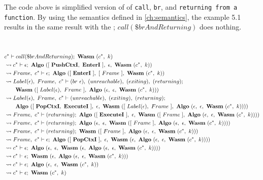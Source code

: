 The code above is simplified version of \spectecp{} of \texttt{call},
\texttt{br}, and \texttt{returning from a function}.
By using the semantics defined in \cref{ch:semantics}, the example 5.1 results
in the same result with the \officialp{}; $call(\$brAndReturning)$ does
nothing.


 \\
\begin{align}
  &c^* \vdash call(\$brAndReturning); ~ \textbf{Wasm} ~ (c^*, ~ k)
  \label{eq:resolve-1} \\
  &\leadsto c^* \vdash \epsilon; ~ \textbf{Algo} ~ ([ ~ \textbf{PushCtxI}, ~ \textbf{EnterI} ~ ], ~ \epsilon, ~ \textbf{Wasm} ~ (c^*, ~ k))
  \label{eq:resolve-2} \\
  &\leadsto Frame, ~ c^* \vdash \epsilon; ~ \textbf{Algo} ~ ([ ~ \textbf{EnterI} ~ ], ~ [ ~ Frame ~ ], ~ \textbf{Wasm} ~ (c^*, ~ k))
  \label{eq:resolve-3} \\
  &\leadsto Label(\epsilon), ~ Frame, ~ c^* \vdash (br ~ \epsilon), ~ (unreachable), ~ (exiting), ~ (returning); \\
  &\quad\quad \textbf{Wasm} ~ ([ ~ Label(\epsilon), ~ Frame ~ ], ~ \textbf{Algo} ~ (\epsilon, ~ \epsilon, ~ \textbf{Wasm} ~ (c^*, ~ k)))
  \label{eq:resolve-4} \\
  &\leadsto Label(\epsilon), ~ Frame, ~ c^* \vdash (unreachable), ~ (exiting), ~ (returning); \\
  &\quad\quad \textbf{Algo} ~ ([ ~ \textbf{PopCtxI}, ~ \textbf{ExecuteI} ~ ], ~ \epsilon, ~ \textbf{Wasm} ~ ([ ~ Label(\epsilon), ~ Frame ~ ], ~ \textbf{Algo} ~ (\epsilon, ~ \epsilon, ~ \textbf{Wasm} ~ (c^*, ~ k))))
  \label{eq:resolve-5} \\
  &\leadsto Frame, ~ c^* \vdash (returning); ~
    \textbf{Algo} ~ ([ ~ \textbf{ExecuteI} ~ ], ~ \epsilon, ~ \textbf{Wasm} ~ ([ ~ Frame ~ ], ~ \textbf{Algo} ~ (\epsilon, ~ \epsilon, ~ \textbf{Wasm} ~ (c^*, ~ k))))
  \label{eq:resolve-6} \\
  &\leadsto Frame, ~ c^* \vdash (returning); ~
    \textbf{Algo} ~ (\epsilon, ~ \epsilon, ~ \textbf{Wasm} ~ ([ ~ Frame ~ ], ~ \textbf{Algo} ~ (\epsilon, ~ \epsilon, ~ \textbf{Wasm} ~ (c^*, ~ k))))
  \label{eq:resolve-7} \\
  &\leadsto Frame, ~ c^* \vdash (returning); ~ \textbf{Wasm} ~ ([ ~ Frame ~ ], ~ \textbf{Algo} ~ (\epsilon, ~ \epsilon, ~ \textbf{Wasm} ~ (c^*, ~ k)))
  \label{eq:resolve-8} \\
  &\leadsto Frame, ~ c^* \vdash \epsilon; ~
    \textbf{Algo} ~ ([ ~ \textbf{PopCtxI} ~ ], ~ \epsilon, ~ \textbf{Wasm} ~ (\epsilon, ~ \textbf{Algo} ~ (\epsilon, ~ \epsilon, ~ \textbf{Wasm} ~ (c^*, ~ k))))
  \label{eq:resolve-9} \\
  &\leadsto c^* \vdash \epsilon; ~
    \textbf{Algo} ~ (\epsilon, ~ \epsilon, ~ \textbf{Wasm} ~ (\epsilon, ~ \textbf{Algo} ~ (\epsilon, ~ \epsilon, ~ \textbf{Wasm} ~ (c^*, ~ k))))
  \label{eq:resolve-10} \\
  &\leadsto c^* \vdash \epsilon; ~ \textbf{Wasm} ~ (\epsilon, ~ \textbf{Algo} ~ (\epsilon, ~ \epsilon, ~ \textbf{Wasm} ~ (c^*, ~ k)))
  \label{eq:resolve-11} \\
  &\leadsto c^* \vdash \epsilon; ~ \textbf{Algo} ~ (\epsilon, ~ \epsilon, ~ \textbf{Wasm} ~ (c^*, ~ k))
  \label{eq:resolve-12} \\
  &\leadsto c^* \vdash \epsilon; ~ \textbf{Wasm} ~ (c^*, ~ k)
  \label{eq:resolve-13}
\end{align}
